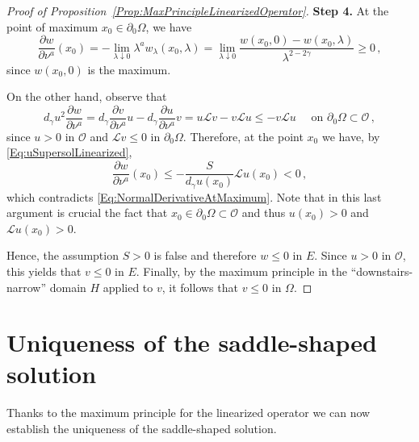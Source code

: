 \documentclass[12pt,reqno]{amsart}
\theoremstyle{definition}
\theoremstyle{remark}
\newcommand{\ocal}{\mathcal{O}}
\newcommand{\s}{\gamma}
\numberwithin{equation}{section}
\begin{document}
\begin{proof}[Proof of Proposition~\ref{Prop:MaxPrincipleLinearizedOperator}]
\textbf{Step 4.}
At the point of maximum $x_0 \in \partial_0 \Omega$, we have
\begin{equation}
\label{Eq:NormalDerivativeAtMaximum}
\dfrac{\partial w}{\partial \nu^a}(x_0) = -\lim_{\lambda \downarrow 0} \lambda^a w_\lambda (x_0,\lambda) = \lim_{\lambda \downarrow 0} \dfrac{w(x_0,0) - w(x_0, \lambda)}{\lambda^{2-2\s}} \geq 0\,,
\end{equation}
since $w(x_0,0)$ is the maximum.

On the other hand, observe that
$$
d_\s u^2 \dfrac{\partial w}{\partial \nu^a} = d_\s  \dfrac{\partial v}{\partial \nu^a} u  - d_\s  \dfrac{\partial u}{\partial \nu^a} v = u \mathscr{L}v  -  v \mathscr{L}u \leq -v \mathscr{L}u \quad \text{ on } \partial_0 \Omega \subset \ocal\,,
$$
since $u>0$ in $\ocal$ and $\mathscr{L}v \leq 0$ in $\partial_0 \Omega $. Therefore, at the point $x_0$ we have, by \eqref{Eq:uSupersolLinearized}, 
$$
\dfrac{\partial w}{\partial \nu^a}(x_0) \leq -\dfrac{S}{d_\s u(x_0)} \mathscr{L}u(x_0) < 0\,,
$$
which contradicts \eqref{Eq:NormalDerivativeAtMaximum}. Note that in this last argument is crucial the fact that $x_0 \in \partial_0 \Omega \subset \ocal$ and thus $u(x_0)>0$ and $\mathscr{L}u (x_0) > 0$. 

Hence, the assumption $S>0$ is false and therefore $w \leq 0$ in $E$. Since $u > 0$ in $\ocal$, this yields that $v \leq 0$ in $E$. Finally, by the maximum principle in the ``downstairs-narrow'' domain $H$ applied to $v$, it follows that $v\leq 0$ in $\Omega$.
\end{proof}



\section{Uniqueness of the saddle-shaped solution}
\label{Sec:Uniqueness}
Thanks to the maximum principle for the linearized operator we can now establish the uniqueness of the saddle-shaped solution.
\end{document}
